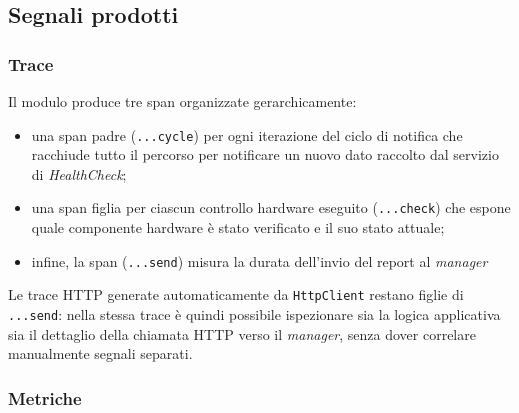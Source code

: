 \newpage
\subsection{Segnali prodotti}

\subsubsection{Trace}

Il modulo produce tre span organizzate gerarchicamente:
\begin{itemize}
      \item una span padre (\texttt{...cycle}) per ogni iterazione del ciclo di notifica che racchiude tutto il percorso per notificare un
            nuovo dato raccolto dal servizio di \emph{HealthCheck};
      \item una span figlia per ciascun controllo hardware eseguito (\texttt{...check}) che espone quale componente hardware è stato
            verificato e il suo stato attuale;
      \item infine, la span (\texttt{...send}) misura la durata dell'invio del report al \emph{manager}
\end{itemize}
Le trace HTTP generate automaticamente da \texttt{HttpClient}
restano figlie di \texttt{...send}: nella stessa trace è quindi possibile
ispezionare sia la logica applicativa sia il dettaglio della chiamata HTTP verso
il \emph{manager}, senza dover correlare manualmente segnali separati.

\subsubsection{Metriche}

